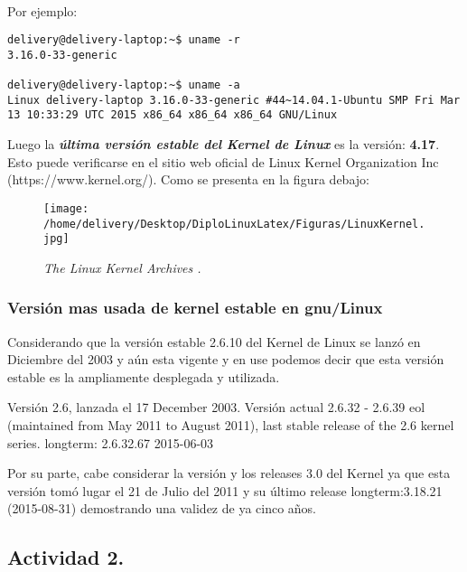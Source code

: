 \documentclass[a4paper,11pt,spanish]{article} %
\newenvironment{myscriptlisting}
{\begin{list}{}{\setlength{\leftmargin}{1em}}\item\scriptsize\bfseries}
{\end{list}}
\begin{document}
\begin{itemize}
\cite{linuxkernel}\\

Por ejemplo:

\begin{myscriptlisting}
 \begin{verbatim}
delivery@delivery-laptop:~$ uname -r
3.16.0-33-generic

delivery@delivery-laptop:~$ uname -a
Linux delivery-laptop 3.16.0-33-generic #44~14.04.1-Ubuntu SMP Fri Mar
13 10:33:29 UTC 2015 x86_64 x86_64 x86_64 GNU/Linux
\end{verbatim}
\end{myscriptlisting}

\end{itemize}

Luego la \textbf{\emph{última versión estable del Kernel de Linux}} es la versión: \textbf{4.17}.
Esto puede verificarse en el sitio web oficial de Linux Kernel Organization Inc (https://www.kernel.org/).
Como se presenta en la figura debajo:

\begin{figure}[h!] 
\centering
\texttt{[image: /home/delivery/Desktop/DiploLinuxLatex/Figuras/LinuxKernel.jpg]}
\caption{\emph{The Linux Kernel Archives \cite{linuxkernel1}.}}
\end{figure}

\clearpage

\subsubsection{Versión mas usada de kernel estable en \ac{gnu}/Linux}
Considerando que la versión estable 2.6.10 del Kernel de Linux se lanzó en Diciembre del 2003 y aún
esta vigente y en use podemos decir que esta versión estable es la ampliamente desplegada y utilizada.

Versión 2.6, lanzada el	17 December 2003. Versión actual 2.6.32 - 2.6.39
\ac{eol} (maintained from May 2011 to August 2011), last stable release of the 2.6 kernel series.
longterm:	2.6.32.67	2015-06-03

Por su parte, cabe considerar la versión y los releases 3.0 del Kernel ya que esta versión tomó lugar 
el 21 de Julio del 2011 y su último release longterm:3.18.21 (2015-08-31) demostrando una validez de ya
cinco años.

\cite{wikikernel1}

\subsection{Actividad 2.}
\end{document}
